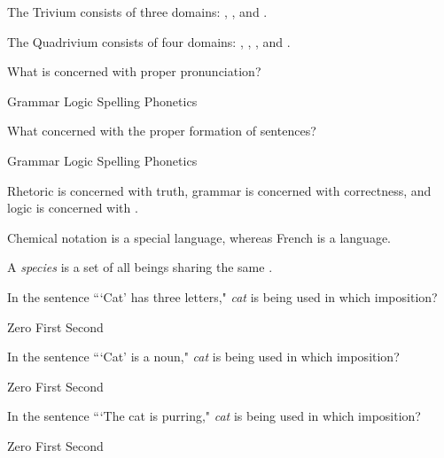 \documentclass[answers]{exam}
\begin{document}
\begin{center}

\end{center}
\vspace{0.2in}
\begin{questions}
      
  \question The Trivium consists of three domains: \fillin[logic], \fillin[grammar], and \fillin[rhetoric].  
  
  \question The Quadrivium consists of four domains: \fillin[arithmetic], \fillin[geometry], \fillin[astronomy], and \fillin[music].  
  
   \question What is concerned with proper pronunciation?

      \begin{oneparchoices}
        \choice Grammar
        \choice Logic
        \choice Spelling
        \CorrectChoice Phonetics
      \end{oneparchoices}

   \question What concerned with the proper formation of sentences?

      \begin{oneparchoices}
        \CorrectChoice Grammar
        \choice Logic
        \choice Spelling
        \choice Phonetics
      \end{oneparchoices}

  \question Rhetoric is concerned with truth, grammar is concerned with correctness, and logic is concerned with \fillin[truth].
  
  \question Chemical notation is a special language, whereas French is a \fillin[common] language.
  
  \question A \textit{species} is a set of all beings sharing the same \fillin[essence].
  
     \question In the sentence ```Cat' has three letters," \textit{cat} is being used in which imposition?

      \begin{oneparchoices}
        \CorrectChoice Zero
        \choice First
        \choice Second
      \end{oneparchoices}
      
     \question In the sentence ```Cat' is a noun," \textit{cat} is being used in which imposition?

      \begin{oneparchoices}
        \choice Zero
        \choice First
        \CorrectChoice Second
      \end{oneparchoices}
      
      \question In the sentence ```The cat is purring," \textit{cat} is being used in which imposition?

      \begin{oneparchoices}
        \choice Zero
        \CorrectChoice First
        \choice Second
      \end{oneparchoices}

\end{questions}
\end{document}
